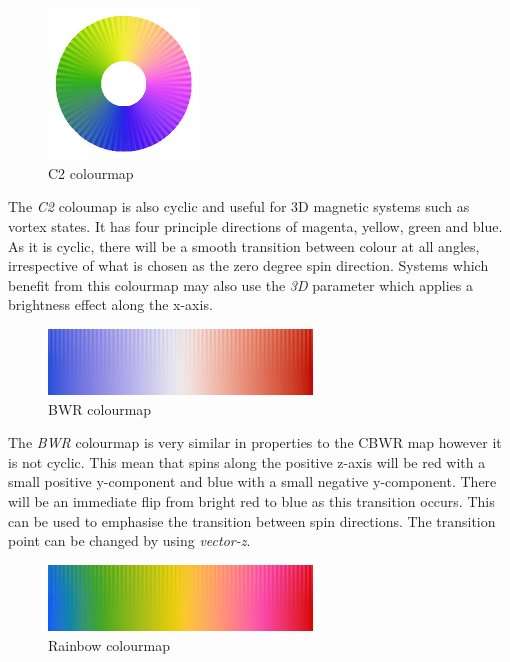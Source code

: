 \begin{figure}[!h]
\center
\includegraphics[width=4cm]{figures/C2_colourmap.jpg}
\\ C2 colourmap
\label{fig:C2_colourmap}
\end{figure}

The \textit{C2} coloumap is also cyclic and useful for 3D magnetic systems such
as vortex states. It has four principle directions of magenta, yellow, green and
blue. As it is cyclic, there will be a smooth transition between colour at all
angles, irrespective of what is chosen as the zero degree spin direction.
Systems which benefit from this colourmap may also use the \textit{3D} parameter
which applies a brightness effect along the x-axis.

\vspace{5pt}
\begin{figure}[!h]
\center
\includegraphics[width=7cm]{figures/BWR_colourmap.jpg}
\\ BWR colourmap
\label{fig:BWR_colourmap}
\end{figure}

The \textit{BWR} colourmap is very similar in properties to the CBWR map however
it is not cyclic. This mean that spins along the positive z-axis will be red
with a small positive y-component and blue with a small negative y-component.
There will be an immediate flip from bright red to blue as this transition
occurs. This can be used to emphasise the transition between spin directions.
The transition point can be changed by using \textit{vector-z}.

\vspace{5pt}
\begin{figure}[!h]
\center
\includegraphics[width=7cm]{figures/Rainbow_colourmap.jpg}
\\ Rainbow colourmap
\label{fig:Rainbow_colourmap}
\end{figure}

